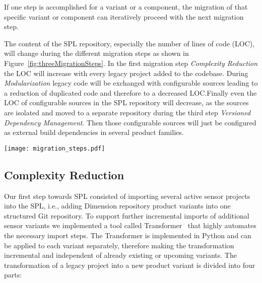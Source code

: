 If one step is accomplished for a variant or a component, the migration of that
specific variant or component can iteratively proceed with the next migration
step.

The content of the SPL repository, especially the number of lines of code (LOC),
will change during the different migration steps as shown in
Figure~\ref{fig:threeMigrationSteps}. In the first migration step
\textit{Complexity Reduction} the LOC will increase with every legacy project
added to the codebase. During \textit{Modularization} legacy code will be
exchanged with configurable sources leading to a reduction of duplicated code
and therefore to a decreased LOC.\@ Finally even the LOC of configurable sources
in the SPL repository will decrease, as the sources are isolated and moved to a
separate repository during the third step \textit{Versioned Dependency
Management}. Then those configurable sources will just be configured as external
build dependencies in several product families.

\begin{figure*}[ht]
  \centering
  \texttt{[image: migration\_steps.pdf]}
  \caption{Three Migration Steps to SPL}
  \label{fig:threeMigrationSteps}
\end{figure*}

\subsection{Complexity Reduction}\label{complexity}

Our first step towards SPL consisted of importing several active sensor projects
into the SPL, i.e., adding Dimension repository product variants into one
structured Git repository. To support further incremental imports of additional
sensor variants we implemented a tool called
Transformer~\cite{GithubTransformer} that highly automates the necessary import
steps. The Transformer is implemented in Python and can be applied to each
variant separately, therefore making the transformation incremental and
independent of already existing or upcoming variants. The transformation of a
legacy project into a new product variant is divided into four parts:

